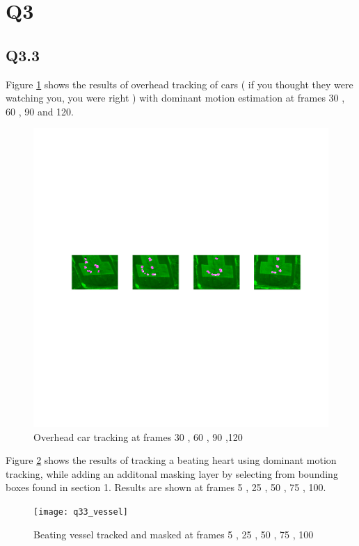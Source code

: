 \documentclass[12pt]{article}
\begin{document}
\section{Q3}
\subsection{Q3.3}
Figure \ref{fig:aerial} shows the results of overhead tracking of cars ( if you thought they were watching you, you were right ) with dominant motion estimation at frames 30 , 60 , 90 and 120.
\begin{figure}[H]
\centering
\includegraphics[page=1,width=1.0\textwidth]{q33_cars}
\caption{ Overhead car tracking at frames 30 , 60 , 90 ,120 }
\label{fig:aerial}
\end{figure}   


Figure \ref {fig:domvessel} shows the results of tracking a beating heart using dominant motion tracking, while adding an additonal masking layer by selecting from bounding boxes found in section 1. Results are shown at frames 5 , 25 , 50 , 75 , 100.
\begin{figure}[H]
\centering
\texttt{[image: q33\_vessel]}
\caption{ Beating vessel tracked and masked at frames 5 , 25 , 50 , 75 , 100 } 
\label{fig:domvessel}
\end{figure}   
\end{document}
